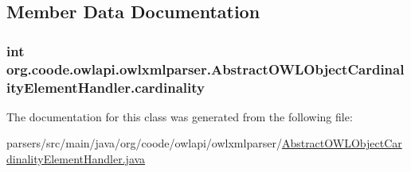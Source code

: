 \subsection{Member Data Documentation}
\hypertarget{classorg_1_1coode_1_1owlapi_1_1owlxmlparser_1_1_abstract_o_w_l_object_cardinality_element_handler_adeef198592d28b67a2f5fffd884cce8d}{
\subsubsection[{cardinality}]{\setlength{\rightskip}{0pt plus 5cm}int org.\-coode.\-owlapi.\-owlxmlparser.\-Abstract\-O\-W\-L\-Object\-Cardinality\-Element\-Handler.\-cardinality\hspace{0.3cm}{\ttfamily [private]}}}\label{classorg_1_1coode_1_1owlapi_1_1owlxmlparser_1_1_abstract_o_w_l_object_cardinality_element_handler_adeef198592d28b67a2f5fffd884cce8d}


The documentation for this class was generated from the following file\-:\begin{DoxyCompactItemize}
\item 
parsers/src/main/java/org/coode/owlapi/owlxmlparser/\hyperlink{_abstract_o_w_l_object_cardinality_element_handler_8java}{Abstract\-O\-W\-L\-Object\-Cardinality\-Element\-Handler.\-java}\end{DoxyCompactItemize}
